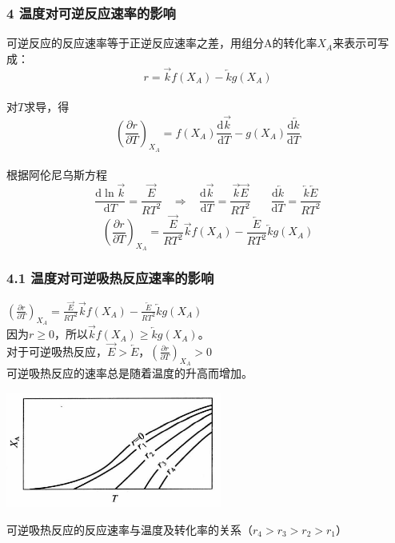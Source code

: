 \begin{frame}
	\frametitle{4 温度对可逆反应速率的影响}
	可逆反应的反应速率等于正逆反应速率之差，用组分A的转化率$X_A$来表示可写成：
	$$r=\overrightarrow{k}f(X_A)-\overleftarrow{k}g(X_A)$$
	\\对$T$求导，得
	$$(\frac{\partial r}{\partial T} )_{X_A}=f({X_A})\frac{\mathrm{d}\overrightarrow{k}}{\mathrm{d}T}-g({X_A})\frac{\mathrm{d}\overleftarrow{k}}{\mathrm{d}T}$$
	\\根据阿伦尼乌斯方程
	$$\frac{\mathrm{d}\ln\overrightarrow{k}}{\mathrm{d}T} =\frac{\overrightarrow{E}}{RT^2}~~~~\Rightarrow~~~~\frac{\mathrm{d}\overrightarrow{k}}{\mathrm{d}T}=\frac{\overrightarrow{k}\overrightarrow{E}}{RT^2}~~~~~~~~\frac{\mathrm{d}\overleftarrow{k}}{\mathrm{d}T}=\frac{\overleftarrow{k}\overleftarrow{E}}{RT^2}$$
	$$(\frac{\partial r}{\partial T} )_{X_A}=\frac{\overrightarrow{E}}{RT^2}\overrightarrow{k}f({X_A})-\frac{\overleftarrow{E}}{RT^2}\overleftarrow{k}g({X_A})$$
\end{frame}


\begin{frame}
	\frametitle{4.1 温度对可逆吸热反应速率的影响}
			$(\frac{\partial r}{\partial T} )_{X_A}=\frac{\overrightarrow{E}}{RT^2}\overrightarrow{k}f({X_A})-\frac{\overleftarrow{E}}{RT^2}\overleftarrow{k}g({X_A})$
	\\因为$r\ge 0$，所以$\overrightarrow{k}f({X_A})\ge \overleftarrow{k}g({X_A})$。
	\\对于可逆吸热反应，$\overrightarrow{E}> \overleftarrow{E}$，$(\frac{\partial r}{\partial T} )_{X_A}> 0$
	\\可逆吸热反应的速率总是随着温度的升高而增加。
	\centerline{\includegraphics[height=3.8cm]{figs/fig2.2}}
	\centerline{\scriptsize{可逆吸热反应的反应速率与温度及转化率的关系（$r_4>r_3>r_2>r_1$）}}
\end{frame}



